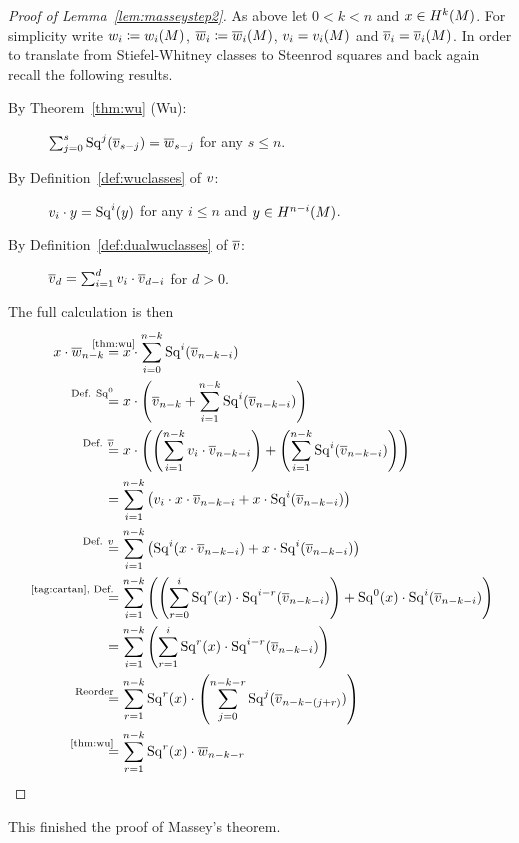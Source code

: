 \begin{proof}[Proof of Lemma~\ref{lem:masseystep2}]
  As above let $0<k<n$ and $x\in H^k(M)$.
  For simplicity write
  $w_{i}\coloneqq{w_{i}}(M)$, $\overline{w}_{i}\coloneqq{\overline{w}_{i}}(M)$,
  $v_{i} = {v_{i}}(M)$ and $\overline{v}_{i} = {\overline{v}_{i}}(M)$.
  In order to translate from Stiefel-Whitney classes to Steenrod
  squares and back again recall the following results.
  \begin{description}
  \item[By Theorem~\ref{thm:wu} (Wu):]
    $\sum_{j=0}^{s} \mathrm{Sq}^{j}(\overline{v}_{s-j}) = \overline{w}_{s-j}$
    for any $s\leq n$.
  \item[By Definition~\ref{def:wuclasses} of $v$:]
    $v_{i} \cdot y = \mathrm{Sq}^{i}(y)$
    for any $i\leq n$ and $y\in H^{n-i}(M)$.
  \item[By Definition~\ref{def:dualwuclasses} of $\overline{v}$:]
    $\overline{v}_{d} = \sum_{i=1}^{d} v_{i}\cdot \overline{v}_{d-i}$ for $d>0$.
  \end{description}
  The full calculation is then
  \begin{align*}
    \qquad
    x\cdot \dualws{n-k}
    &\clapequalsby{\ref{thm:wu}}
      x\cdot \sum_{i=0}^{n-k} \Sq i(\dualvu{n-k-i}) \\
    &\equalsby{Def. $\Sq 0$}
      x\cdot\left(
      \dualvu{n-k} + \sum_{i=1}^{n-k} \Sq i(\dualvu{n-k-i})
      \right) \\
    &\equalsby{Def. $\dualVu$}
      x\cdot\left(
      \left(\sum_{i=1}^{n-k} \vu{i}\cdot\dualvu{n-k-i}\right)
      + \left(\sum_{i=1}^{n-k} \Sq i(\dualvu{n-k-i})\right)
      \right) \\
    &=
      \sum_{i=1}^{n-k} \left(
      \vu{i}\cdot x\cdot \dualvu{n-k-i}
      + x\cdot \Sq i(\dualvu{n-k-i})
      \right) \\
    &\equalsby{Def. $\Vu$}
      \sum_{i=1}^{n-k} \left(
      \Sq i (x\cdot \dualvu{n-k-i})
      + x\cdot \Sq i(\dualvu{n-k-i})
      \right) \\
    &\equalsby{\ref{tag:cartan}, Def.}
      \sum_{i=1}^{n-k} \left(
      \left( \sum_{r=0}^{i} \Sq r(x)\cdot \Sq{i-r}(\dualvu{n-k-i}) \right)
      + \Sq 0(x)\cdot \Sq i(\dualvu{n-k-i})
      \right) \\
    &=
      \sum_{i=1}^{n-k} \left(
      \sum_{r=1}^{i} \Sq r(x)\cdot \Sq{i-r}(\dualvu{n-k-i})
      \right) \\
    &\equalsby{Reorder}
      \sum_{r=1}^{n-k} \Sq r(x) \cdot
      \left( \sum_{j=0}^{n-k-r} \Sq j(\dualvu{n-k-(j+r)}) \right) \\
    &\equalsby{\ref{thm:wu}}
      \sum_{r=1}^{n-k} \Sq r(x) \cdot\dualws{n-k-r}
      \qedhere
  \end{align*}
\end{proof}
This finished the proof of Massey's theorem.


